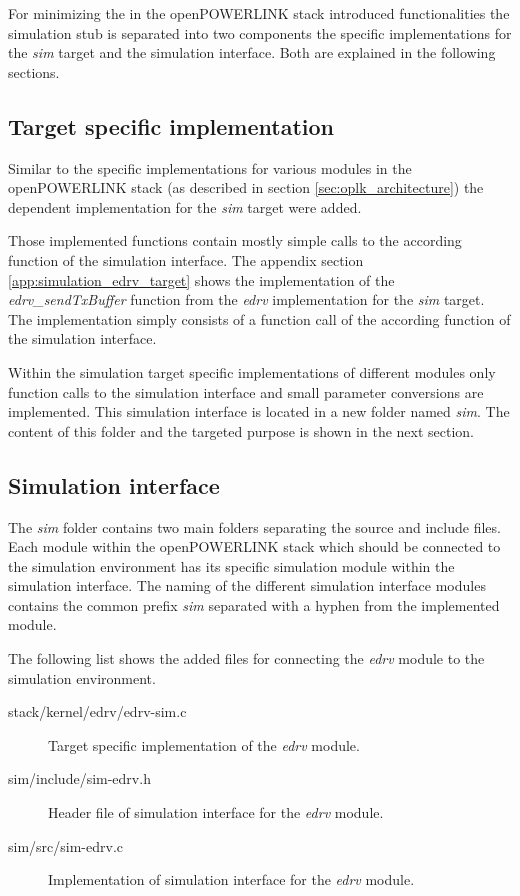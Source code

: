 For minimizing the in the openPOWERLINK stack introduced functionalities the simulation stub is separated into two components the specific implementations for the \emph{sim} target and the simulation interface.
Both are explained in the following sections.

\subsection{Target specific implementation}
\label{sec:porting_simstub_target}

Similar to the specific implementations for various modules in the openPOWERLINK stack (as described in section \ref{sec:oplk_architecture}) the  dependent implementation for the \emph{sim} target were added.

Those implemented functions contain mostly simple calls to the according function of the simulation interface.
The appendix section \ref{app:simulation_edrv_target} shows the implementation of the \emph{edrv\_sendTxBuffer} function from the \emph{edrv} implementation for the \emph{sim} target.
The implementation simply consists of a function call of the according function of the simulation interface.

Within the simulation target specific implementations of different modules only function calls to the simulation interface and small parameter conversions are implemented.
This simulation interface is located in a new folder named \emph{sim}.
The content of this folder and the targeted purpose is shown in the next section.

\subsection{Simulation interface}
\label{sec:porting_simstub_siminterface}
The \emph{sim} folder contains two main folders separating the source and include files.
Each module within the openPOWERLINK stack which should be connected to the simulation environment has its specific simulation module within the simulation interface.
The naming of the different simulation interface modules contains the common prefix \emph{sim} separated with a hyphen from the implemented module.

The following list shows the added files for connecting the \emph{edrv} module to the simulation environment.

\begin{description}
    \item[stack/kernel/edrv/edrv-sim.c] Target specific implementation of the \emph{edrv} module.
    \item[sim/include/sim-edrv.h] Header file of simulation interface for the \emph{edrv} module.
    \item[sim/src/sim-edrv.c] Implementation of simulation interface for the \emph{edrv} module.
\end{description}

